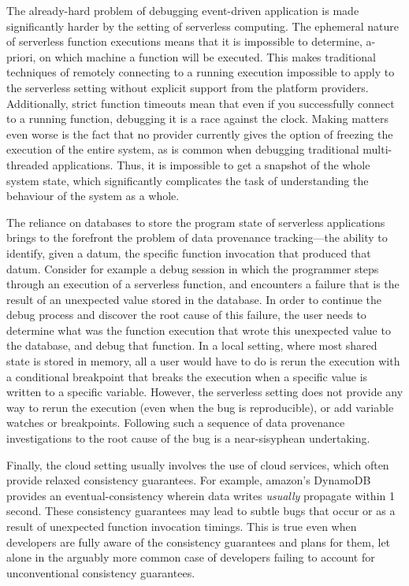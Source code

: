 The already-hard problem of debugging event-driven application is made
significantly harder by the setting of serverless computing. The ephemeral
nature of serverless function executions means that it is impossible to
determine, a-priori, on which machine a function will be executed. This makes
traditional techniques of remotely connecting to a running execution impossible
to apply to the serverless setting without explicit support from the platform
providers. Additionally, strict function timeouts mean that even if you
successfully connect to a running function, debugging it is a race against the
clock. Making matters even worse is the fact that no provider currently gives
the option of freezing the execution of the entire system, as is common when
debugging traditional multi-threaded applications. Thus, it is impossible to get
a snapshot of the whole system state, which significantly complicates the task
of understanding the behaviour of the system as a whole.

The reliance on databases to store the program state of serverless applications
brings to the forefront the problem of data provenance tracking---the ability to
identify, given a datum, the specific function invocation that produced that
datum. Consider for example a debug session in which the programmer steps
through an execution of a serverless function, and encounters a failure that is
the result of an unexpected value stored in the database. In order to continue
the debug process and discover the root cause of this failure, the user needs to
determine what was the function execution that wrote this unexpected value to
the database, and debug that function. In a local setting, where most shared
state is stored in memory, all a user would have to do is rerun the execution
with a conditional breakpoint that breaks the execution when a specific value is
written to a specific variable. However, the serverless setting does not provide
any way to rerun the execution (even when the bug is reproducible), or add
variable watches or breakpoints. Following such a sequence of data provenance
investigations to the root cause of the bug is a near-sisyphean undertaking.

Finally, the cloud setting usually involves the use of cloud services, which
often provide relaxed consistency guarantees. For example, amazon's DynamoDB
provides an eventual-consistency wherein data writes \emph{usually} propagate
within 1 second. These consistency guarantees may lead to subtle bugs that occur
or as a result of unexpected function invocation timings. This is true even when
developers are fully aware of the consistency guarantees and plans for them, let
alone in the arguably more common case of developers failing to account for
unconventional consistency guarantees. 

